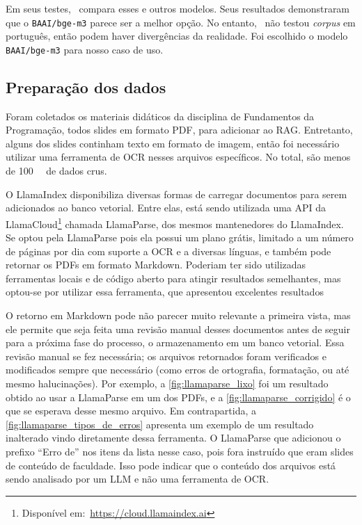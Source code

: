 \documentclass[journal]{IEEEtran}
\begin{document}
Em seus testes,~\cite{borgne2024multilingualembed} compara esses e outros modelos.
Seus resultados demonstraram que o \texttt{BAAI/bge-m3} parece ser a melhor opção.
No entanto,~\cite{borgne2024multilingualembed} não testou \textit{corpus} em português, então podem haver divergências da realidade.
Foi escolhido o modelo \texttt{BAAI/bge-m3} para nosso caso de uso.

\subsection{Preparação dos dados\label{sec:prep_dados}}

\noindent%
Foram coletados os materiais didáticos da disciplina de Fundamentos da Programação, todos slides em formato PDF, para adicionar ao RAG\@.
Entretanto, alguns dos slides continham texto em formato de imagem, então foi necessário utilizar uma ferramenta de OCR nesses arquivos específicos.
No total, são menos de \SI{100}{\mega\byte} de dados crus.

O LlamaIndex disponibiliza diversas formas de carregar documentos para serem adicionados ao banco vetorial.
Entre elas, está sendo utilizada uma API da LlamaCloud\footnote{Disponível em:~\url{https://cloud.llamaindex.ai}} chamada LlamaParse, dos mesmos mantenedores do LlamaIndex.
Se optou pela LlamaParse pois ela possui um plano grátis, limitado a um número de páginas por dia com suporte a OCR e a diversas línguas, e também pode retornar os PDFs em formato Markdown.
Poderiam ter sido utilizadas ferramentas locais e de código aberto para atingir resultados semelhantes, mas optou-se por utilizar essa ferramenta, que apresentou excelentes resultados

O retorno em Markdown pode não parecer muito relevante a primeira vista, mas ele permite que seja feita uma revisão manual desses documentos antes de seguir para a próxima fase do processo, o armazenamento em um banco vetorial.
Essa revisão manual se fez necessária; os arquivos retornados foram verificados e modificados sempre que necessário (como erros de ortografia, formatação, ou até mesmo halucinações).
Por exemplo, a \cref{fig:llamaparse_lixo} foi um resultado obtido ao usar a LlamaParse em um dos PDFs, e a \cref{fig:llamaparse_corrigido} é o que se esperava desse mesmo arquivo.
Em contrapartida, a \cref{fig:llamaparse_tipos_de_erros} apresenta um exemplo de um resultado inalterado vindo diretamente dessa ferramenta.
O LlamaParse que adicionou o prefixo ``Erro de'' nos itens da lista nesse caso, pois fora instruído que eram slides de conteúdo de faculdade.
Isso pode indicar que o conteúdo dos arquivos está sendo analisado por um LLM e não uma ferramenta de OCR\@.
\end{document}
